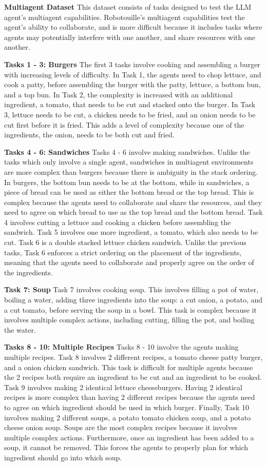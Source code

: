 \textbf{Multiagent Dataset} This dataset consists of tasks designed to test the LLM agent's multiagent capabilities. Robotouille's multiagent capabilities test the agent's ability to collaborate, and is more difficult because it includes tasks where agents may potentially interfere with one another, and share resources with one another. 

\textbf{Tasks 1 - 3: Burgers} The first 3 tasks involve cooking and assembling a burger with increasing levels of difficulty. In Task 1, the agents need to chop lettuce, and cook a patty, before assembling the burger with the patty, lettuce, a bottom bun, and a top bun. In Task 2, the complexity is increased with an additional ingredient, a tomato, that needs to be cut and stacked onto the burger. In Task 3, lettuce needs to be cut, a chicken needs to be fried, and an onion needs to be cut first before it is fried. This adds a level of complexity because one of the ingredients, the onion, needs to be both cut and fried. 

\textbf{Tasks 4 - 6: Sandwiches} Tasks 4 - 6 involve making sandwiches. Unlike the tasks which only involve a single agent, sandwiches in multiagent environments are more complex than burgers because there is ambiguity in the stack ordering. In burgers, the bottom bun needs to be at the bottom, while in sandwiches, a piece of bread can be used as either the bottom bread or the top bread. This is complex because the agents need to collaborate and share the resources, and they need to agree on which bread to use as the top bread and the bottom bread. Task 4 involves cutting a lettuce and cooking a chicken before assembling the sandwich. Task 5 involves one more ingredient, a tomato, which also needs to be cut. Task 6 is a double stacked lettuce chicken sandwich. Unlike the previous tasks, Task 6 enforces a strict ordering on the placement of the ingredients, meaning that the agents need to collaborate and properly agree on the order of the ingredients. 

\textbf{Task 7: Soup} Task 7 involves cooking soup. This involves filling a pot of water, boiling a water, adding three ingredients into the soup: a cut onion, a potato, and a cut tomato, before serving the soup in a bowl. This task is complex because it involves multiple complex actions, including cutting, filling the pot, and boiling the water. 

\textbf{Tasks 8 - 10: Multiple Recipes} Tasks 8 - 10 involve the agents making multiple recipes. Task 8 involves 2 different recipes, a tomato cheese patty burger, and a onion chicken sandwich. This task is difficult for multiple agents because the 2 recipes both require an ingredient to be cut and an ingredient to be cooked. Task 9 involves making 2 identical lettuce cheeseburgers. Having 2 identical recipes is more complex than having 2 different recipes because the agents need to agree on which ingredient should be used in which burger. Finally, Task 10 involves making 2 different soups, a potato tomato chicken soup, and a potato cheese onion soup. Soups are the most complex recipes because it involves multiple complex actions. Furthermore, once an ingredient has been added to a soup, it cannot be removed. This forces the agents to properly plan for which ingredient should go into which soup. 